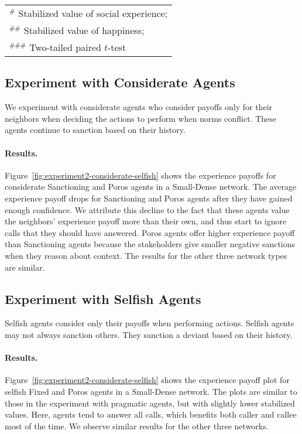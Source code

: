 \documentclass[11pt,          %
               phd,           %
               onehalfspacing %
               ]{ncsuthesis}
\newcommand{\frameworkB}{Poros\xspace}
\begin{document}
\begin{table*}[!htb]
\begin{tabular}{c}
\multicolumn{1}{l}{$^\#$ Stabilized value of social experience;}\\
\multicolumn{1}{l}{$^{\#\#}$ Stabilized value of happiness;}\\
\multicolumn{1}{l}{$^{\#\#\#}$ Two-tailed paired $t$-test}

\end{tabular}

\end{table*}

\subsection{Experiment with Considerate Agents} 
We experiment with considerate agents who consider payoffs only for
their neighbors when deciding the actions to perform when norms
conflict. These agents continue to sanction based on their history.

\paragraph{Results.} Figure~\ref{fig:experiment2-considerate-selfish}
shows the experience payoffs for considerate Sanctioning and \frameworkB
agents in a Small-Dense network. The average experience payoff drops for
Sanctioning and \frameworkB agents after they have gained enough
confidence. We attribute this decline to the fact that these agents
value the neighbors' experience payoff more than their own, and thus
start to ignore calls that they should have answered. \frameworkB agents
offer higher experience payoff than Sanctioning agents because the
stakeholders give smaller negative sanctions when they reason about
context. The results for the other three network types are similar.

\subsection{Experiment with Selfish Agents} 
Selfish agents consider only their payoffs when performing actions.
Selfish agents may not always sanction others. They sanction a deviant
based on their history.

\paragraph{Results.} Figure~\ref{fig:experiment2-considerate-selfish}
shows the experience payoff plot for selfish Fixed and \frameworkB agents
in a Small-Dense network. The plots are similar to those in the
experiment with pragmatic agents, but with slightly lower stabilized
values. Here, agents tend to answer all calls, which benefits both
caller and callee most of the time. We observe similar results for the
other three networks.
\end{document}
